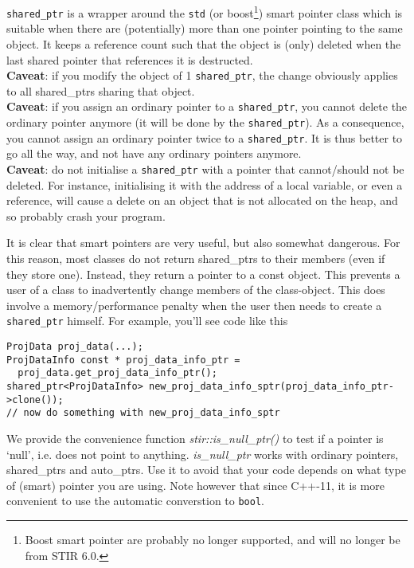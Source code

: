\documentclass{article}
\begin{document}
\texttt{shared\_ptr} is a wrapper around the \texttt{std} (or boost\footnote{Boost smart pointer are probably no longer supported, and will no longer be from STIR 6.0.}) smart pointer class which 
is suitable when there are (potentially) more than one pointer 
pointing to the same object. It keeps a reference count such 
that the object is (only) deleted when the last shared pointer 
that references it is destructed. \\
\textbf{Caveat}: if you modify the object of 1 \texttt{shared\_ptr}, the change 
obviously applies to all shared\_ptrs sharing that object.\\
\textbf{Caveat}: if you assign an ordinary pointer to a \texttt{shared\_ptr}, you 
cannot delete the ordinary pointer anymore (it will be done by 
the \texttt{shared\_ptr}). As a consequence, you cannot assign an ordinary 
pointer twice to a \texttt{shared\_ptr}. It is thus better to go all the 
way, and not have any ordinary pointers anymore.\\
\textbf{Caveat}: do not initialise a \texttt{shared\_ptr} with a pointer that cannot/should 
not be deleted. For instance, initialising it with the address 
of a local variable, or even a reference, will cause a delete 
on an object that is not allocated on the heap, and so probably 
crash your program.

It is clear that smart pointers are very useful, but also somewhat 
dangerous. For this reason, most classes do not return shared\_ptrs 
to their members (even if they store one). Instead, they return 
a pointer to a const object. This prevents a user of a class 
to inadvertently change members of the class-object. This does 
involve a memory/performance penalty when the user then needs to create 
a \texttt{shared\_ptr} himself. For example, you'll see code like this

\begin{verbatim}
ProjData proj_data(...);
ProjDataInfo const * proj_data_info_ptr = 
  proj_data.get_proj_data_info_ptr();
shared_ptr<ProjDataInfo> new_proj_data_info_sptr(proj_data_info_ptr->clone());
// now do something with new_proj_data_info_sptr
\end{verbatim}


We provide the convenience function \textit{stir::is\_null\_ptr()} 
to test if a pointer is `null', i.e. does not point to anything. \textit{is\_null\_ptr} 
works with ordinary pointers, shared\_ptrs and auto\_ptrs. Use 
it to avoid that your code depends on what type of (smart) pointer 
you are using. Note however that since C++-11, it is more convenient to use the
automatic converstion to \texttt{bool}.
\end{document}
